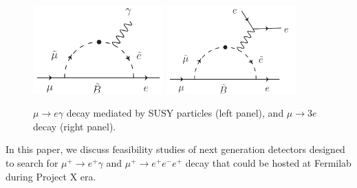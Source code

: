 \begin{figure}[htbp]
\begin{center}
\includegraphics[width=5cm]{Figures/mu_e_gamma_diagram.pdf} \hspace*{2cm}
\includegraphics[width=5cm]{Figures/mu_3e_diagram.pdf}
\caption{\label{CL:mutoegamma}$\mu \rightarrow e\gamma$ decay mediated by SUSY particles (left panel), and $\mu \rightarrow 3e$ decay (right panel).}
\end{center}
\end{figure}

In this paper, we discuss feasibility studies of next generation detectors designed to search for $\mu^+\to e^+\gamma$ and $\mu^+\to e^+e^-e^+$ decay that could be hosted at Fermilab during Project X era.



